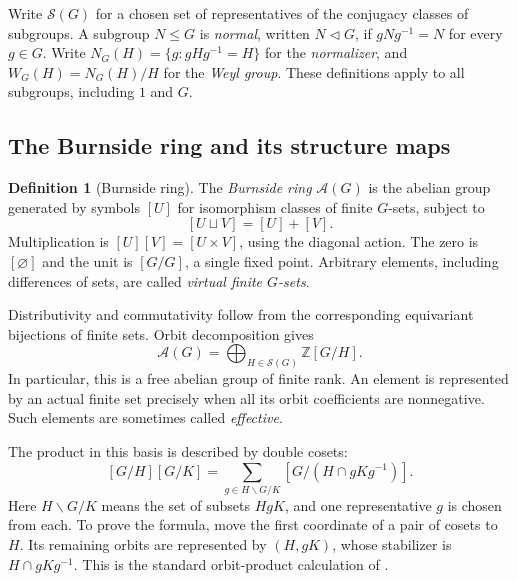 \documentclass[11pt,a4paper]{article}
\newcommand{\defn}[1]{\textsl{\color{darkblue} #1}}
\numberwithin{equation}{section}
\theoremstyle{definition}
\newtheorem{definition}[theorem]{Definition}
\theoremstyle{remark}
\newcommand{\Z}{\mathbb Z}
\newcommand{\G}{G}
\newcommand{\Burn}{\mathcal A}
\begin{document}
Write $\mathscr S(\G)$ for a chosen set of representatives of the
conjugacy classes of subgroups.  A subgroup $N\leq\G$ is
\defn{normal}, written $N\triangleleft\G$, if $gNg^{-1}=N$ for every
$g\in\G$.  Write
$N_\G(H)=\{g:gHg^{-1}=H\}$ for the \defn{normalizer}, and
$W_\G(H)=N_\G(H)/H$ for the \defn{Weyl group}.  These definitions
apply to all subgroups, including $1$ and $\G$.

\subsection{The Burnside ring and its structure maps}
\label{subsec:burnside-ring}

\begin{definition}[Burnside ring]
The \defn{Burnside ring} $\Burn(\G)$ is the abelian group generated by
symbols $[U]$ for isomorphism classes of finite $\G$-sets, subject to
\[
 [U\sqcup V]=[U]+[V].
\]
Multiplication is $[U][V]=[U\times V]$, using the diagonal action.
The zero is $[\varnothing]$ and the unit is $[\G/\G]$, a single fixed
point.  Arbitrary elements, including differences of sets, are called
\defn{virtual finite $\G$-sets}.
\end{definition}
Distributivity and commutativity follow from the corresponding
equivariant bijections of finite sets.  Orbit decomposition gives
\begin{equation}\label{eq:orbit-basis}
 \Burn(\G)=\bigoplus_{H\in\mathscr S(\G)}\Z[\G/H].
\end{equation}
In particular, this is a free abelian group of finite rank.  An
element is represented by an actual finite set precisely when all
its orbit coefficients are nonnegative.  Such elements are sometimes
called \defn{effective}.

The product in this basis is described by double cosets:
\begin{equation}\label{eq:burnside-product}
 [\G/H][\G/K]
  =\sum_{g\in H\backslash\G/K}[\G/(H\cap gKg^{-1})].
\end{equation}
Here $H\backslash\G/K$ means the set of subsets $HgK$, and one
representative $g$ is chosen from each.  To prove the formula, move
the first coordinate of a pair of cosets to $H$.  Its remaining
orbits are represented by $(H,gK)$, whose stabilizer is
$H\cap gKg^{-1}$.  This is the standard orbit-product calculation
of \cite[\S\S2.2--3.1]{Bouc}.
\end{document}
